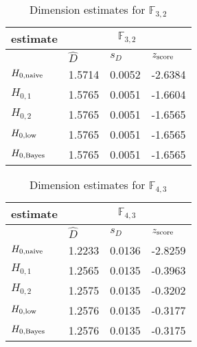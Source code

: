 \begin{table}[H] 
\begin{center}
\caption{Dimension estimates for $\mathbb{F}_{3,2}$}
\label{tab:est1}
\begin{tabular}{|l|l|l|l|}
\hline
 estimate & \multicolumn{3}{c|}{$\mathbb{F}_{3,2}$} \\
\hline
 & $\hat{D}$ & $s_{D}$ & $z_{\mbox{\scriptsize{score}}}$ \\
\hline 
$ H_{0,\mbox{\scriptsize{naive}}} $ & 1.5714 & 0.0052 & -2.6384 \\ 
\hline 
$ H_{0,1} $ & 1.5765 & 0.0051 & -1.6604 \\ 
\hline 
$ H_{0,2} $ & 1.5765 & 0.0051 & -1.6565 \\ 
\hline 
$ H_{0,\mbox{\scriptsize{low}}} $ & 1.5765 & 0.0051 & -1.6565 \\ 
\hline 
$ H_{0,\mbox{\scriptsize{Bayes}}} $ & 1.5765 & 0.0051 & -1.6565 \\ 
\hline 
\end{tabular}
\end{center}
\end{table} 

\begin{table}[H] 
\begin{center}
\caption{Dimension estimates for $\mathbb{F}_{4,3}$}
\label{tab:est2}
\begin{tabular}{|l|l|l|l|}
\hline
 estimate & \multicolumn{3}{c|}{$\mathbb{F}_{4,3}$} \\
\hline
 & $\hat{D}$ & $s_{D}$ & $z_{\mbox{\scriptsize{score}}}$ \\
\hline 
$ H_{0,\mbox{\scriptsize{naive}}} $ & 1.2233 & 0.0136 & -2.8259 \\ 
\hline 
$ H_{0,1} $ & 1.2565 & 0.0135 & -0.3963 \\ 
\hline 
$ H_{0,2} $ & 1.2575 & 0.0135 & -0.3202 \\ 
\hline 
$ H_{0,\mbox{\scriptsize{low}}} $ & 1.2576 & 0.0135 & -0.3177 \\ 
\hline 
$ H_{0,\mbox{\scriptsize{Bayes}}} $ & 1.2576 & 0.0135 & -0.3175 \\ 
\hline  
\end{tabular}
\end{center}
\end{table} 

